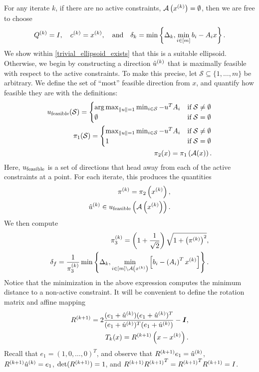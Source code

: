 \documentclass{article}
\begin{document}
For any iterate $k$, if there are no active constraints, ${\mathcal A}\left(x^{(k)}\right) = \emptyset$, then we are free to choose
\begin{align}
\label{define_linear_trivial_ellipse}
{Q^{(k)}} = I, \quad c^{(k)} = x^{(k)}, \quad \textrm{and} \quad \delta_k = \min\left\{\Delta_k, \min_{i \in [m]}{b_i - A_i x}\right\}.
\end{align}
We show within \cref{trivial_ellipsoid_exists} that this is a suitable ellipsoid.
Otherwise, we begin by constructing a direction ${{{\hat u}^{(k)}}}$ that is maximally feasible with respect to the active constraints.
To make this precise, let $\mathcal S \subseteq \{1, \ldots, m\}$ be arbitrary.
We define the set of ``most'' feasible direction from $x$, and quantify how feasible they are with the definitions:
\begin{align}
{u_{\textrm{feasible}}} (\mathcal S) = \begin{cases}
\operatorname*{arg\,max}_{\|u\| = 1} \min_{i \in \mathcal S} -u^T{{A}}_i & \text{if} \; \mathcal S \ne \emptyset \\
\emptyset & \text{if} \; \mathcal S = \emptyset
\end{cases} \label{define_alpha_one} \\
{\pi_1}(\mathcal S) = \begin{cases}
\max_{\|u\| = 1} \min_{i \in \mathcal S} -u^T{{A}}_i & \text{if} \; \mathcal S \ne \emptyset \\
1 & \text{if} \; \mathcal S = \emptyset
\end{cases} \label{define_alpha_two} \\
\pi_2(x) = {\pi_1}\left({\mathcal A}(x)\right). \label{define_alpha_three}
\end{align}
Here, ${u_{\textrm{feasible}}}$ is a set of directions that head away from each of the active constraints at a point.
For each iterate, this produces the quantities
\begin{align}
\pi^{(k)} =  \pi_2\left(x^{(k)}\right) \label{define_alpha_k}, \\
{{{\hat u}^{(k)}}} \in  {u_{\textrm{feasible}}}\left({\mathcal A}\left(x^{(k)}\right)\right). \label{define_u_k}
\end{align}
We then compute
\begin{align}
\pi_3^{(k)}=\left(1+\frac{1}{\sqrt{2}}\right)\sqrt{1+\left(\pi^{(k)}\right)^2}, \label{define_alphakp} \\
\delta_{f} = \frac 1 {\pi_3^{(k)}} \min\left\{\Delta_k, \min_{i \in [m] \setminus {\mathcal A}\left(x^{(k)}\right)} \left[{{b}}_i - \left({{A}}_i\right)^Tx^{(k)}\right]\right\}. \label{define_deltaf}
\end{align}
Notice that the minimization in the above expression computes the minimum distance to a non-active constraint.
It will be convenient to define the rotation matrix and affine mapping
\begin{align}
{R^{(k+1)}} = 2\frac{(e_1 + {{{\hat u}^{(k)}}})(e_1 +{{{\hat u}^{(k)}}})^T}{(e_1 +{{{\hat u}^{(k)}}})^T(e_1 +{{{\hat u}^{(k)}}})} - \boldsymbol I, \label{define_r} \\
T_k(x) = {R^{(k+1)}}\left(x - x^{(k)}\right). \label{define_affine_mapping}
\end{align}
Recall that $e_1 = (1, 0, \ldots, 0)^T$, and observe that ${R^{(k+1)}} e_1 = {{{\hat u}^{(k)}}}$, ${R^{(k+1)}} {{{\hat u}^{(k)}}} = e_1$, $\det({R^{(k+1)}}) = 1$, and 
${R^{(k+1)}} {R^{(k+1)}} ^T = {R^{(k+1)}} ^T{R^{(k+1)}} = I$.
\end{document}
